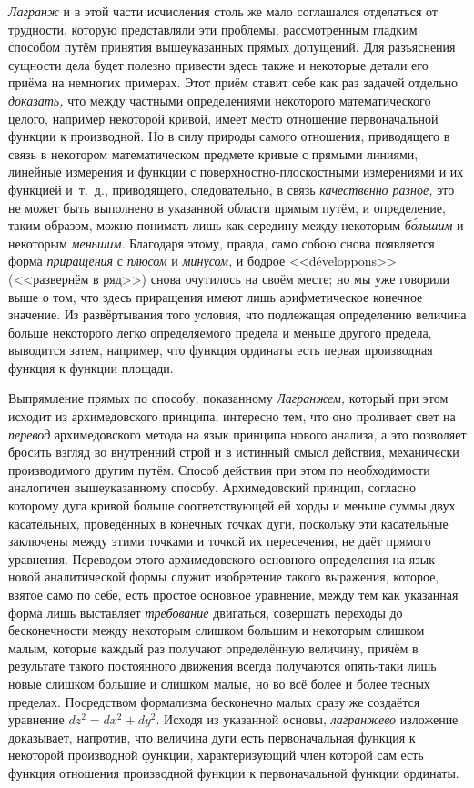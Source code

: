 {\em Лагранж} и в этой части исчисления столь же мало соглашался отделаться от
трудности, которую представляли эти проблемы, рассмотренным гладким способом
путём принятия вышеуказанных прямых допущений. Для разъяснения сущности дела
будет полезно привести здесь также и некоторые детали его приёма на немногих
примерах. Этот приём ставит себе как раз задачей отдельно {\em доказать,} что
между частными определениями некоторого математического целого, например
некоторой кривой, имеет место отношение первоначальной функции к производной.
Но в силу природы самого отношения, приводящего в связь в некотором
математическом предмете кривые с прямыми линиями, линейные измерения и функции
с поверхностно-плоскостными измерениями и их функцией и~т.~д., приводящего,
следовательно, в связь {\em качественно разное,} это не может быть выполнено в
указанной области прямым путём, и определение, таким образом, можно понимать
лишь как середину между некоторым {\em б\'{о}льшим} и некоторым {\em меньшим}.
Благодаря этому, правда, само собою снова появляется форма {\em приращения} с
{\em плюсом} и {\em минусом,} и бодрое <<développons>> (<<развернём в ряд>>)
снова очутилось на своём месте; но мы уже говорили выше о том, что здесь
приращения имеют лишь арифметическое конечное значение. Из развёртывания того
условия, что подлежащая определению величина больше некоторого легко
определяемого предела и меньше другого предела, выводится затем, например, что
функция ординаты есть первая производная функция к функции площади.

Выпрямление прямых по способу, показанному {\em Лагранжем,} который при этом
исходит из архимедовского принципа, интересно тем, что оно проливает свет на
{\em перевод} архимедовского метода на язык принципа нового анализа, а это
позволяет бросить взгляд во внутренний строй и в истинный смысл действия,
механически производимого другим путём. Способ действия при этом по
необходимости аналогичен вышеуказанному способу. Архимедовский принцип,
согласно которому дуга кривой больше соответствующей ей хорды и меньше суммы
двух касательных, проведённых в конечных точках дуги, поскольку эти касательные
заключены между этими точками и точкой их пересечения, не даёт прямого
уравнения. Переводом этого архимедовского основного определения на язык новой
аналитической формы служит изобретение такого выражения, которое, взятое само
по себе, есть простое основное уравнение, между тем как указанная форма лишь
выставляет {\em требование} двигаться, совершать переходы до бесконечности
между некоторым слишком большим и некоторым слишком малым, которые каждый раз
получают определённую величину, причём в результате такого постоянного движения
всегда получаются опять-таки лишь новые слишком большие и слишком малые, но во
всё более и более тесных пределах. Посредством формализма бесконечно малых
сразу же создаётся уравнение $dz^2=dx^2+dy^2$. Исходя из указанной основы,
{\em лагранжево} изложение доказывает, напротив, что величина дуги есть
первоначальная функция к некоторой производной функции, характеризующий член
которой сам есть функция отношения производной функции к первоначальной функции
ординаты.

